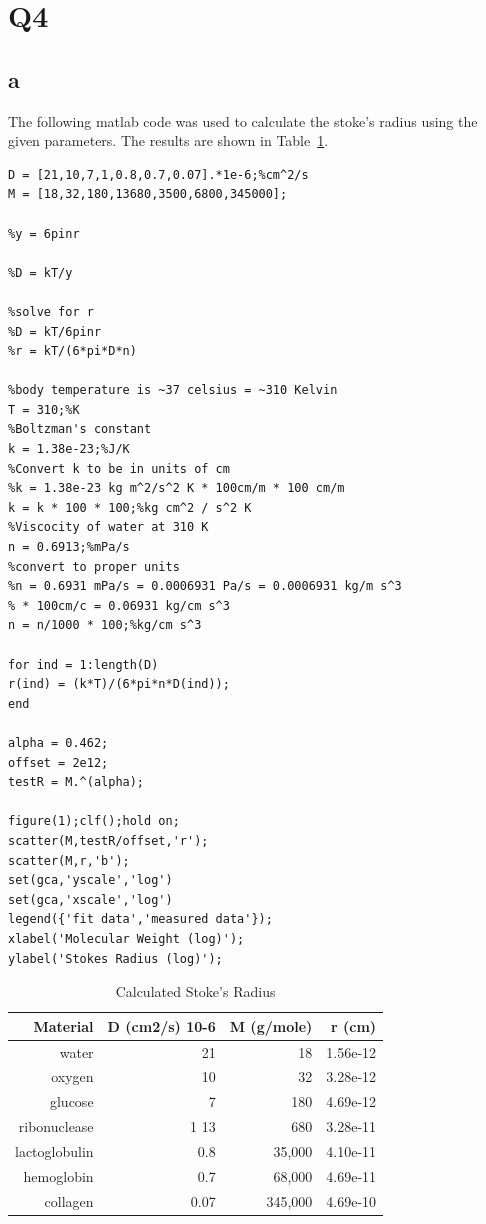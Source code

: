 \documentclass[12pt]{article}
\begin{document}
\section{Q4}
\subsection{a}
The following matlab code was used to calculate the stoke's radius using the given parameters. The results are shown in Table~\ref{tab1}.
\begin{lstlisting}[style=Matlab-editor]
D = [21,10,7,1,0.8,0.7,0.07].*1e-6;%cm^2/s 
M = [18,32,180,13680,3500,6800,345000];

%y = 6pinr

%D = kT/y

%solve for r
%D = kT/6pinr
%r = kT/(6*pi*D*n)

%body temperature is ~37 celsius = ~310 Kelvin
T = 310;%K
%Boltzman's constant
k = 1.38e-23;%J/K
%Convert k to be in units of cm
%k = 1.38e-23 kg m^2/s^2 K * 100cm/m * 100 cm/m
k = k * 100 * 100;%kg cm^2 / s^2 K
%Viscocity of water at 310 K
n = 0.6913;%mPa/s
%convert to proper units
%n = 0.6931 mPa/s = 0.0006931 Pa/s = 0.0006931 kg/m s^3
% * 100cm/c = 0.06931 kg/cm s^3
n = n/1000 * 100;%kg/cm s^3

for ind = 1:length(D)
r(ind) = (k*T)/(6*pi*n*D(ind));
end

alpha = 0.462;
offset = 2e12;
testR = M.^(alpha);

figure(1);clf();hold on; 
scatter(M,testR/offset,'r');
scatter(M,r,'b');
set(gca,'yscale','log')
set(gca,'xscale','log')
legend({'fit data','measured data'});
xlabel('Molecular Weight (log)');
ylabel('Stokes Radius (log)');
\end{lstlisting}

\begin{table}[h]
	\caption{Calculated Stoke's Radius}
	\centering
	\begin{tabular}{|r|r|r|r|} \hline
		
		Material&D (cm2/s) 10-6& M (g/mole)& r (cm)\\
		\hline
		water& 21& 18& 1.56e-12\\
		oxygen& 10& 32& 3.28e-12\\
		glucose& 7& 180&4.69e-12 \\
		ribonuclease& 1 13& 680&3.28e-11 \\
		lactoglobulin& 0.8& 35,000& 4.10e-11\\
		hemoglobin& 0.7& 68,000& 4.69e-11\\
		collagen& 0.07& 345,000& 4.69e-10\\
		\hline
	\end{tabular}
	\label{tab1}
\end{table}
\end{document}
